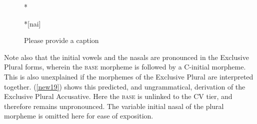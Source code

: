 \documentclass[output=paper]{langscibook}
\begin{document}
\begin{figure}
    \centering
    \begin{minipage}[t]{.1\textwidth}
        *
    \end{minipage}
    \begin{minipage}[t]{.3\textwidth}
    \end{minipage}
    \begin{minipage}[t]{.1\textwidth}
        \rightarrow 
    \end{minipage}
    \begin{minipage}[t]{.3\textwidth}
        \centering
        *[nai]
    \end{minipage}
    \caption{\color{red}Please provide a caption}
    \label{new18}
\end{figure}

Note also that the initial vowels and the nasals are pronounced in the Exclusive Plural forms, wherein the \textsc{base} morpheme is followed by a C-initial morpheme. This is also unexplained if the morphemes of the Exclusive Plural are interpreted together. (\ref{new19}) shows this predicted, and ungrammatical, derivation of the Exclusive Plural Accusative. Here the \textsc{base} is unlinked to the CV tier, and therefore remains unpronounced. The variable initial nasal of the plural morpheme is omitted here for ease of exposition.
\end{document}
